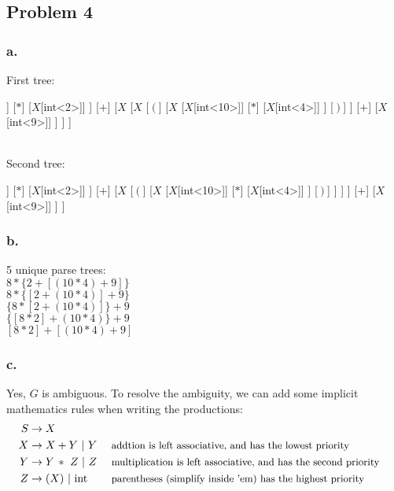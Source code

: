 \documentclass{article}
\begin{document}
	\newpage
	\subsection*{Problem 4}
	\subsubsection*{a.}
	First tree:\\
	\begin{forest}
		[$S$, for tree={parent anchor=south, child anchor=north}
			[$X$
				[$X$
					[$X$[int<8>]]
					[$*$]
					[$X$[int<2>]]
				]
				[$+$]
				[$X$
					[$X$
						[$\left( \right.$]
						[$X$
							[$X$[int<10>]]
							[$*$]
							[$X$[int<4>]]	
						]
						[$\left. \right) $]
					]
					[$+$]
					[$X$[int<9>]]
				]
			]
		]
	\end{forest}\\
	Second tree:\\
	\begin{forest}
		[$S$, for tree={parent anchor=south, child anchor=north}
			[$X$
				[$X$
					[$X$
						[$X$[int<8>]]
						[$*$]
						[$X$[int<2>]]
					]
					[$+$]
					[$X$
						[$\left( \right.$]
						[$X$
						[$X$[int<10>]]
						[$*$]
						[$X$[int<4>]]	
						]
						[$\left. \right) $]
						]
					]
				]
				[$+$]
				[$X$[int<9>]]
			]
		]	
	\end{forest}
	
	\subsubsection*{b.}
	5 unique parse trees:\\
	$8 * \{ 2 + [(10*4) + 9 ]\}$\\
	$8 * \{ [ 2 + (10*4) ] + 9\}$\\
	$\{8 * [ 2 + (10*4) ] \} + 9$\\
	$\{[ 8*2 ] + (10*4)\} + 9$\\
	$[8*2]+ [(10*4) + 9]$
	
	\subsubsection*{c.}
	Yes, $G$ is ambiguous. To resolve the ambiguity, we can add some implicit mathematics rules when writing the productions:
	\begin{align*}
		S &\rightarrow X\\
		X &\rightarrow X + Y~ | ~Y &\ &\text{{\small addtion is left associative, and has the lowest priority}} \\
		Y &\rightarrow Y_{\ }*~Z_{\ } | ~Z &\ &\text{{\small multiplication is left associative, and has the second priority}} \\
		Z &\rightarrow ( X )~|~\mathrm{int} &\ &\text{{\small parentheses (simplify inside 'em) has the highest priority}}
	\end{align*}
	
\end{document}
